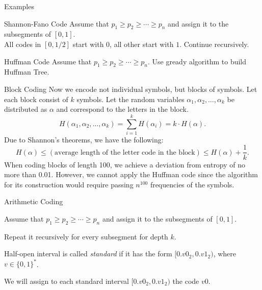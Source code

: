 \documentclass[aspectratio=169]{beamer}
\newcommand{\bits}{\{0,1\}}
\newcommand{\seqn}[2]{{#1}_1,{#1}_2,\dotsc,{#1}_{#2}}
\begin{document}
    \begin{frame}{Examples}
        \begin{block}{Shannon-Fano Code}
            Assume that \(p_1 \ge p_2 \ge \dotsb \ge p_n\) and assign it to the subsegments of $[0,1]$. \\ All codes in $[0,1/2]$ start with $0$, all other start with $1$. Continue recursively. \vspace{2cm}

        \end{block}
        \begin{block}{Huffman Code}
            Assume that \(p_1 \ge p_2 \ge \dotsb \ge p_n\). Use gready algorithm to build Huffman Tree.
            \vspace{3cm}

        \end{block}
    \end{frame}

    \begin{frame}{Block Coding}
        Now we encode not individual symbols, but blocks of symbols.
        Let each block consist of \(k\) symbols. Let the random variables \(\seqn{\alpha}{k}\) be distributed as \(\alpha\) and correspond to the letters in the block.
        \[
        H(\seqn{\alpha}{k}) = \sum_{i=1}^k H(\alpha_i) = k \cdot H(\alpha).
        \]
        Due to Shannon's theorems, we have the following:
        \[
        H(\alpha) \le (\text{average length of the letter code in the block}) \le H(\alpha) +
        \frac{1}{k}.
        \]
        When coding blocks of length 100, we achieve a deviation from entropy of no more than 0.01. However, we cannot apply the Huffman code since the algorithm for its construction would require passing \(n^{100}\) frequencies of the symbols.
    \end{frame}


    \begin{frame}{Arithmetic Coding}



        \begin{definition}
            Assume that \(p_1 \ge p_2 \ge \dotsb \ge p_n\) and assign it to the subsegments of $[0,1]$.

            Repeat it recursively for every subsegment for depth $k$.

            Half-open interval is called \emph{standard} if it has the form
            \([0.v0_2, 0.v1_2)\), where \(v\in\bits^*\).

            We will assign to each standard interval \([0.v0_2, 0.v1_2)\) the code \(v0\).
            \vspace{5cm}


        \end{definition}
    \end{frame}
\end{document}
